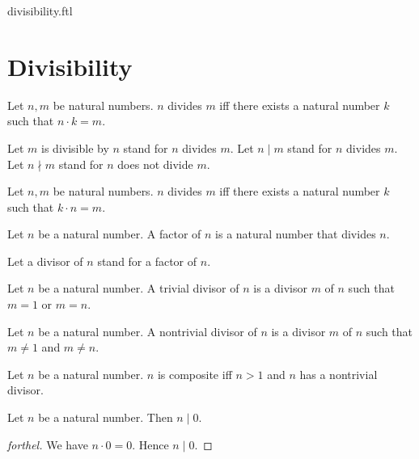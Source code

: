 \documentclass{naproche-library}
\begin{document}
\begin{smodule}{divisibility.ftl}

  \section*{Divisibility}

  \begin{definition}[forthel,id=ARITHMETIC_07_4239998993825792]
    Let $n, m$ be natural numbers.
    $n$ divides $m$ iff there exists a natural number $k$ such that $n \cdot k = m$.

    Let $m$ is divisible by $n$ stand for $n$ divides $m$.
    Let $n \mid m$ stand for $n$ divides $m$.
    Let $n \nmid m$ stand for $n$ does not divide $m$.
  \end{definition}

  \begin{lemma}[forthel,id=ARITHMETIC_07_1478855118290944]
    Let $n, m$ be natural numbers.
    $n$ divides $m$ iff there exists a natural number $k$ such that $k \cdot n = m$.
  \end{lemma}

  \begin{definition}[forthel,id=ARITHMETIC_07_1311437490225152]
    Let $n$ be a natural number.
    A factor of $n$ is a natural number that divides $n$.

    Let a divisor of $n$ stand for a factor of $n$.
  \end{definition}

  \begin{definition}[forthel,id=ARITHMETIC_10_5438991513944064]
    Let $n$ be a natural number.
    A trivial divisor of $n$ is a divisor $m$ of $n$ such that $m = 1$ or $m = n$.
  \end{definition}

  \begin{definition}[forthel,id=ARITHMETIC_10_8768240253665280]
    Let $n$ be a natural number.
    A nontrivial divisor of $n$ is a divisor $m$ of $n$ such that $m \neq 1$ and $m \neq n$.
  \end{definition}

  \begin{definition}[forthel,id=ARITHMETIC_10_8020087063707648]
    Let $n$ be a natural number.
    $n$ is composite iff $n > 1$ and $n$ has a nontrivial divisor.
  \end{definition}

  \begin{proposition}[forthel,id=ARITHMETIC_07_2242720387039232]
    Let $n$ be a natural number.
    Then $n \mid 0$.
  \end{proposition}
  \begin{proof}[forthel]
    We have $n \cdot 0 = 0$.
    Hence $n \mid 0$.
  \end{proof}


\end{smodule}
\end{document}
